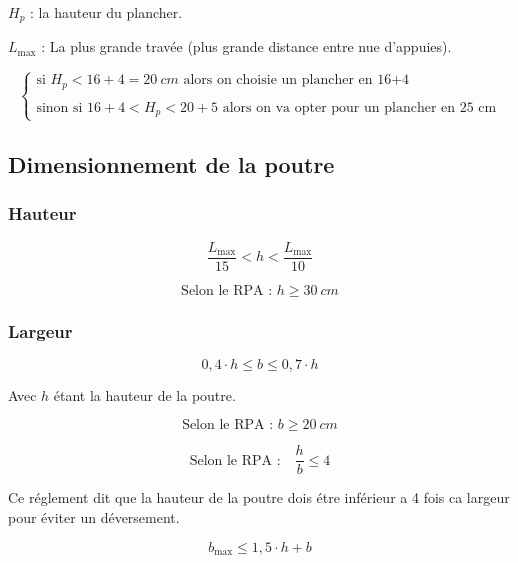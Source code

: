 \documentclass[12pt,a4paper]{article}
\begin{document}
	$H_{p}$ : la hauteur du plancher.
	
	$L_{\max}$ : La plus grande travée (plus grande distance entre nue d'appuies).
	
	
	
	\[ \begin{cases}
		\text{si  } H_{p} < 16+4 = 20~\unit{cm} \text{  alors on choisie un plancher en 16+4} \\\\
		\text{sinon si  } 16+4 < H_{p} < 20+5 \text{  alors on va opter pour un plancher en 25 cm} 
	\end{cases} \]
	
	
	
	
	\subsection{Dimensionnement de la poutre}
	
	\subsubsection{Hauteur}
	
	\[ \dfrac{L_{\max}}{15} < h < \dfrac{L_{\max}}{10} \]
	
	
	\[ \text{Selon le RPA : } h \geq 30~\unit{cm} \]

	
	
	\subsubsection{Largeur}
	
	\[ 0,4 \cdot h \leq b \leq 0,7 \cdot h \]
	
	Avec $h$ étant la hauteur de la poutre.
	
	\[ \text{Selon le RPA : } b \geq 20~\unit{cm} \]
	
	
	\vspace{\baselineskip}
	
	\[ \text{Selon le RPA :} \quad \dfrac{h}{b} \leq 4 \]
	
	Ce réglement dit que la hauteur de la poutre dois étre inférieur a 4 fois ca largeur pour éviter un déversement.
	
	\[ b_{\max} \leq 1,5 \cdot h + b \]
	
	\vspace{\baselineskip}
	
	
	
\end{document}
